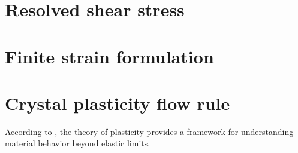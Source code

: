 \documentclass[12pt]{article}
\begin{document}
\section{Resolved shear stress}
\section{Finite strain formulation}
\section{Crystal plasticity flow rule}

According to \cite{Hill1950}, the theory of plasticity provides a framework for understanding material behavior beyond elastic limits.



\end{document}
